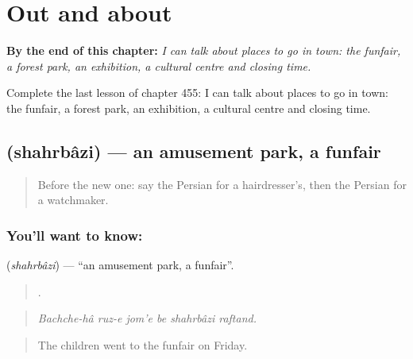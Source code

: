 
\chapter{Out and about}
\label{ch:fa-out-and-about}

\begin{chapteropening}
\textbf{By the end of this chapter:} \emph{I can talk about places to go in town: the funfair, a forest park, an exhibition, a cultural centre and closing time.}

Complete the last lesson of chapter 455: I can talk about places to go in town: the funfair, a forest park, an exhibition, a cultural centre and closing time.
\end{chapteropening}

\section[\texorpdfstring{\fa{شهربازی} (shahrbâzi)}{شهربازی (shahrbâzi)}]{ (shahrbâzi) — an amusement park, a funfair}

\label{lesson:FA-C455-shahrbazi}



\begin{quote}
Before the new one: say the Persian for a hairdresser's, then the Persian for a watchmaker.
\end{quote}

\subsection*{You'll want to know: }
\textbf{} (\emph{shahrbâzi}) — \textquotedblleft{}an amusement park, a funfair\textquotedblright{}.

\begin{quote}
      .
\end{quote}

\begin{quote}
\emph{Bachche-hâ ruz-e jom'e be shahrbâzi raftand.}
\end{quote}

\begin{quote}
The children went to the funfair on Friday.
\end{quote}

